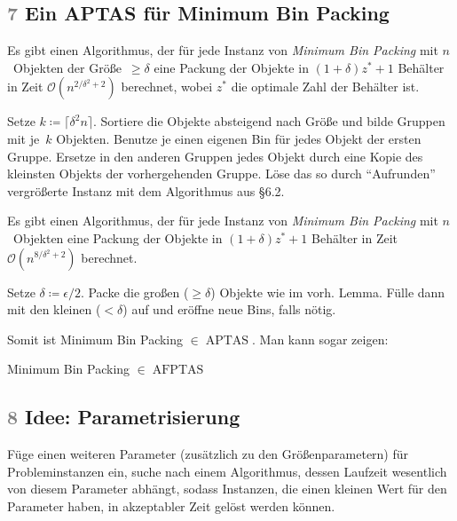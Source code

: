 \documentclass{cheat-sheet}
\DeclareMathOperator{\APTAS}{APTAS} %
\DeclareMathOperator{\AFPTAS}{AFPTAS} %
\renewcommand{\O}{\mathcal{O}} %
\newcommand{\ceil}[1]{\lceil #1 \rceil} %
\newcommand{\Problem}[1]{\textcolor{ProblemColor}{\textbf{#1}}}
\newcommand{\scriptSection}[1]{\textcolor{gray}{#1}\enspace}
\begin{document}
\subsection{\scriptSection{7} Ein APTAS für \Problem{Minimum Bin Packing}}

\begin{lem}
  Es gibt einen Algorithmus, der für jede Instanz von \textit{Minimum Bin Packing} mit $n$~Objekten der Größe~$\geq \delta$ eine Packung der Objekte in $(1 + \delta) z^* + 1$ Behälter in Zeit $\O(n^{2/\delta^2 + 2})$ berechnet, wobei $z^*$ die optimale Zahl der Behälter ist.
\end{lem}

\begin{alg}
  Setze $k \coloneqq \ceil{\delta^2 n}$.
  Sortiere die Objekte absteigend nach Größe und bilde Gruppen mit je~$k$ Objekten.
  Benutze je einen eigenen Bin für jedes Objekt der ersten Gruppe.
  Ersetze in den anderen Gruppen jedes Objekt durch eine Kopie des kleinsten Objekts der vorhergehenden Gruppe.
  Löse das so durch "`Aufrunden"' vergrößerte Instanz mit dem Algorithmus aus §6.2.
\end{alg}

\begin{satz}
  Es gibt einen Algorithmus, der für jede Instanz von \textit{Minimum Bin Packing} mit $n$~Objekten eine Packung der Objekte in $(1 + \delta) z^* + 1$ Behälter in Zeit $\O(n^{8/\delta^2 + 2})$ berechnet.
\end{satz}

\begin{alg}
  Setze $\delta \coloneqq \epsilon / 2$.
  Packe die großen ($\geq \delta$) Objekte wie im vorh\@. Lemma.
  Fülle dann mit den kleinen ($< \delta$) auf und eröffne neue Bins, falls nötig.
\end{alg}

Somit ist Minimum Bin Packing $\in \APTAS$.
Man kann sogar zeigen:

\begin{resultat}
  Minimum Bin Packing $\in \AFPTAS$
\end{resultat}

\subsection{\scriptSection{8} Idee: Parametrisierung}

\begin{vorgehen}
  Füge einen weiteren Parameter (zusätzlich zu den Größenparametern) für Probleminstanzen ein, suche nach einem Algorithmus, dessen Laufzeit wesentlich von diesem Parameter abhängt, sodass Instanzen, die einen kleinen Wert für den Parameter haben, in akzeptabler Zeit gelöst werden können.
\end{vorgehen}
\end{document}
